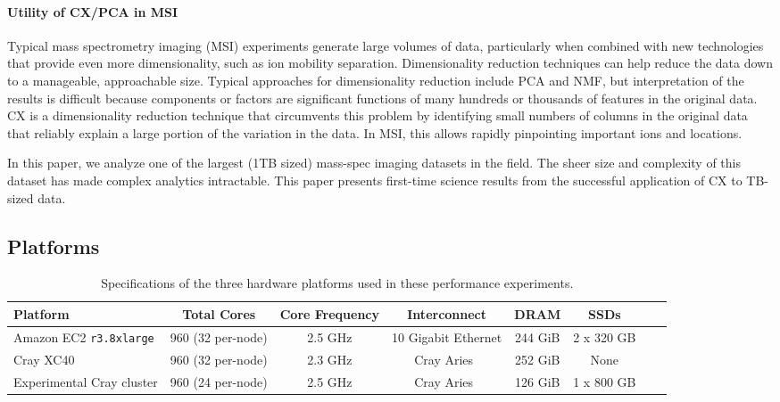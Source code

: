 
\paragraph{Utility of CX/PCA in MSI}
Typical mass spectrometry imaging (MSI) experiments generate large volumes of data, particularly when combined with new
technologies that provide even more dimensionality, such as ion mobility separation.
Dimensionality reduction techniques can help reduce the data down to a manageable, approachable size.
Typical approaches for dimensionality reduction include PCA and NMF, but interpretation of the results is difficult
because components or factors are significant functions of many hundreds or thousands of features in the original data.
CX is a dimensionality reduction technique that circumvents this problem by identifying small numbers of columns in the
original data that reliably explain a large portion of the variation in the data.
In MSI, this allows rapidly pinpointing important ions and locations.

In this paper, we analyze one of the largest (1TB sized) mass-spec imaging datasets in the field. The sheer size and complexity of this dataset
has made complex analytics intractable. This paper presents first-time science results from the successful application of CX to TB-sized data.

\subsection{Platforms}

  \begin{table*}
    \begin{center}
    \begin{tabular}{| l | c | c | c | c | c | c | c |}
    \toprule
    \textbf{Platform} & \textbf{Total Cores} & \textbf{Core Frequency} & \textbf{Interconnect} & \textbf{DRAM} & \textbf{SSDs} \\
    \midrule
    Amazon EC2 \texttt{r3.8xlarge} & 960 (32 per-node) & 2.5 GHz & 10 Gigabit Ethernet & 244 GiB & 2 x 320 GB \\
    \midrule
    Cray XC40 & 960 (32 per-node) & 2.3 GHz & Cray Aries~\cite{alverson2012cray,craycascadesc12} & 252 GiB & None \\
    \midrule
    Experimental Cray cluster & 960 (24 per-node) & 2.5 GHz & Cray Aries~\cite{alverson2012cray,craycascadesc12} & 126 GiB & 1 x 800 GB \\
    \bottomrule
    \end{tabular}
    \end{center}
    \caption{Specifications of the three hardware platforms used in these performance experiments.}
    \label{tab:hwspecs}
  \end{table*}

